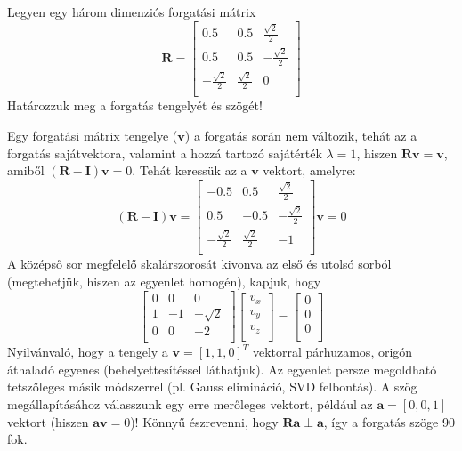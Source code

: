 \begin{execise}
	Legyen egy három dimenziós forgatási mátrix 
	\begin{equation*}
	\mathbf{R}=\begin{bmatrix}
	0.5 & 0.5 & \frac{\sqrt{2}}{2} \\
	0.5 & 0.5 & -\frac{\sqrt{2}}{2} \\
	-\frac{\sqrt{2}}{2} & \frac{\sqrt{2}}{2} & 0 \\
	\end{bmatrix}
	\end{equation*}
	Határozzuk meg a forgatás tengelyét és szögét!
\end{execise}
\begin{answer}
	Egy forgatási mátrix tengelye ($\mathbf{v}$) a forgatás során nem változik, tehát az a forgatás sajátvektora, valamint a hozzá tartozó sajátérték $\lambda=1$, hiszen $\mathbf{R}\mathbf{v}=\mathbf{v}$, amiből $(\mathbf{R}-\mathbf{I})\mathbf{v}=0$. Tehát keressük az a $\mathbf{v}$ vektort, amelyre:
	\begin{equation*}
	(\mathbf{R}-\mathbf{I})\mathbf{v}=\begin{bmatrix}
	-0.5 & 0.5 & \frac{\sqrt{2}}{2} \\
	0.5 & -0.5 & -\frac{\sqrt{2}}{2} \\
	-\frac{\sqrt{2}}{2} & \frac{\sqrt{2}}{2} & -1 \\
	\end{bmatrix}\mathbf{v}=0
	\end{equation*}
	A középső sor megfelelő skalárszorosát kivonva az első és utolsó sorból (megtehetjük, hiszen az egyenlet homogén), kapjuk, hogy
	\begin{equation*}
	\begin{bmatrix}
	0 & 0 & 0 \\
	1 & -1 & -\sqrt{2} \\
	0 & 0 & -2 \\
	\end{bmatrix}
	\begin{bmatrix}
	v_x \\ v_y \\ v_z \\
	\end{bmatrix}=
	\begin{bmatrix}
	0 \\ 0 \\ 0 \\
	\end{bmatrix}
	\end{equation*}
	Nyilvánvaló, hogy a tengely a $\mathbf{v}=\left[1,1,0\right]^T$ vektorral párhuzamos, origón áthaladó egyenes (behelyettesítéssel láthatjuk). Az egyenlet persze megoldható tetszőleges másik módszerrel (pl. Gauss elimináció, SVD felbontás). A szög megállapításához válasszunk egy erre merőleges vektort, például az $\mathbf{a}=\left[0,0,1\right]$ vektort (hiszen $\mathbf{a}\mathbf{v}=0$)! Könnyű észrevenni, hogy $\mathbf{R}\mathbf{a} \perp \mathbf{a}$, így a forgatás szöge 90 fok.
\end{answer}

